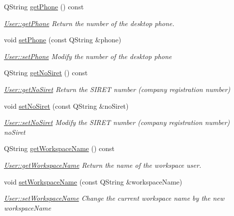 \begin{DoxyCompactItemize}
Q\-String \hyperlink{classModels_1_1User_adc8fbd6d75a41d9ac9ee9473d781d1c1}{get\-Phone} () const 
\begin{DoxyCompactList}\small\item\em \hyperlink{classModels_1_1User_adc8fbd6d75a41d9ac9ee9473d781d1c1}{User\-::get\-Phone} Return the number of the desktop phone. \end{DoxyCompactList}\item 
void \hyperlink{classModels_1_1User_adb132ecafc7cc0afd42fc260f8a2e7b9}{set\-Phone} (const Q\-String \&phone)
\begin{DoxyCompactList}\small\item\em \hyperlink{classModels_1_1User_adb132ecafc7cc0afd42fc260f8a2e7b9}{User\-::set\-Phone} Modify the number of the desktop {\itshape phone} \end{DoxyCompactList}\item 
Q\-String \hyperlink{classModels_1_1User_a617ee9ede3791842fbf8593f08660d37}{get\-No\-Siret} () const 
\begin{DoxyCompactList}\small\item\em \hyperlink{classModels_1_1User_a617ee9ede3791842fbf8593f08660d37}{User\-::get\-No\-Siret} Return the S\-I\-R\-E\-T number (company registration number) \end{DoxyCompactList}\item 
void \hyperlink{classModels_1_1User_ae751ee06859dffce0cad08005c42c933}{set\-No\-Siret} (const Q\-String \&no\-Siret)
\begin{DoxyCompactList}\small\item\em \hyperlink{classModels_1_1User_ae751ee06859dffce0cad08005c42c933}{User\-::set\-No\-Siret} Modify the S\-I\-R\-E\-T number (company registration number) {\itshape no\-Siret} \end{DoxyCompactList}\item 
Q\-String \hyperlink{classModels_1_1User_adf4c52429656a4f44c15d879caee5b10}{get\-Workspace\-Name} () const 
\begin{DoxyCompactList}\small\item\em \hyperlink{classModels_1_1User_adf4c52429656a4f44c15d879caee5b10}{User\-::get\-Workspace\-Name} Return the name of the workspace user. \end{DoxyCompactList}\item 
void \hyperlink{classModels_1_1User_ae51aa34e41159fe7e4541a8cfddc50a3}{set\-Workspace\-Name} (const Q\-String \&workspace\-Name)
\begin{DoxyCompactList}\small\item\em \hyperlink{classModels_1_1User_ae51aa34e41159fe7e4541a8cfddc50a3}{User\-::set\-Workspace\-Name} Change the current workspace name by the new {\itshape workspace\-Name} \end{DoxyCompactList}\item 

\end{DoxyCompactItemize}
